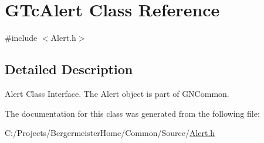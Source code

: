 \hypertarget{class_g_tc_alert}{}\section{G\+Tc\+Alert Class Reference}
\label{class_g_tc_alert}


{\ttfamily \#include $<$Alert.\+h$>$}



\subsection{Detailed Description}
Alert Class Interface. The Alert object is part of G\+N\+Common. 

The documentation for this class was generated from the following file\+:\begin{DoxyCompactItemize}
\item 
C\+:/\+Projects/\+Bergermeister\+Home/\+Common/\+Source/\mbox{\hyperlink{_alert_8h}{Alert.\+h}}\end{DoxyCompactItemize}
